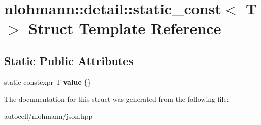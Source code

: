 \hypertarget{structnlohmann_1_1detail_1_1static__const}{}\section{nlohmann\+:\+:detail\+:\+:static\+\_\+const$<$ T $>$ Struct Template Reference}
\label{structnlohmann_1_1detail_1_1static__const}
\subsection*{Static Public Attributes}
\begin{DoxyCompactItemize}
\item 
\mbox{\label{structnlohmann_1_1detail_1_1static__const_a6bb7ab2ddd6abc41fb4ffb7c6dfa237e}} 
static constexpr T {\bfseries value} \{\}
\end{DoxyCompactItemize}


The documentation for this struct was generated from the following file\+:\begin{DoxyCompactItemize}
\item 
autocell/nlohmann/json.\+hpp\end{DoxyCompactItemize}
